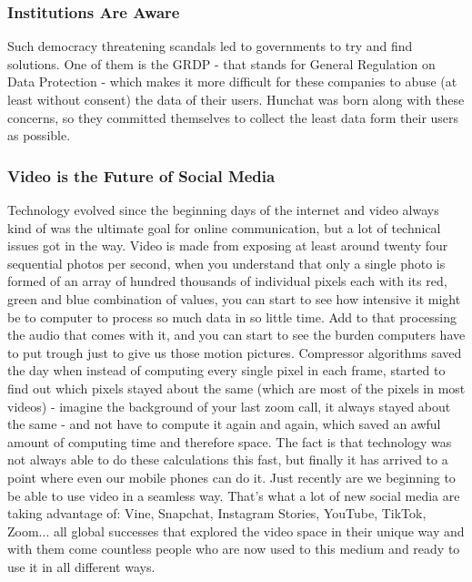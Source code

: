 \documentclass[12pt]{article}
\begin{document}
	\subsubsection{Institutions Are Aware}
	Such democracy threatening scandals led to governments to try and find solutions. One of them is the GRDP - that stands for General Regulation on Data Protection - which makes it more difficult for these companies to abuse (at least without consent) the data of their users. Hunchat was born along with these concerns, so they committed themselves to collect the least data form their users as possible.
	
	\subsubsection{Video is the Future of Social Media}
	Technology evolved since the beginning days of the internet and video always kind of was the ultimate goal for online communication, but a lot of technical issues got in the way. Video is made from exposing at least around twenty four sequential photos per second, when you understand that only a single photo is formed of an array of hundred thousands of individual pixels each with its red, green and blue combination of values, you can start to see how intensive it might be to computer to process so much data in so little time. Add to that processing the audio that comes with it, and you can start to see the burden computers have to put trough just to give us those motion pictures. Compressor algorithms saved the day when instead of computing every single pixel in each frame, started to find out which pixels stayed about the same (which are most of the pixels in most videos) - imagine the background of your last zoom call, it always stayed about the same - and not have to compute it again and again, which saved an awful amount of computing time and therefore space. The fact is that technology was not always able to do these calculations this fast, but finally it has arrived to a point where even our mobile phones can do it. Just recently are we beginning to be able to use video in a seamless way. That's what a lot of new social media are taking advantage of: Vine, Snapchat, Instagram Stories, YouTube, TikTok, Zoom... all global successes that explored the video space in their unique way and with them come countless people who are now used to this medium and ready to use it in all different ways.
	
\end{document}
